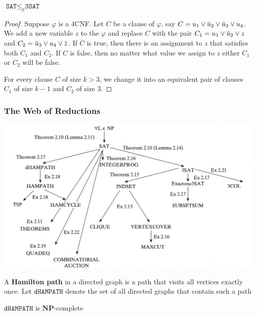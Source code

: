 \documentclass[11pt]{article}
\def \NP {\textbf{NP}}
\def \NP {\textbf{NP}}
\def \SAT {\texttt{SAT}}
\def \TSAT {\texttt{3SAT}}
\def \dHAMPATH {\texttt{dHAMPATH}}
\begin{document}
\begin{lemma}[]
\(\SAT\le_p\TSAT\)
\end{lemma}

\begin{proof}
Suppose \(\varphi\) is a 4CNF. Let \(C\) be a clause of \(\varphi\), say \(C=u_1\vee\baru_2\vee\baru_3\vee u_4\).
We add a new variable \(z\) to the \(\varphi\) and replace \(C\) with the pair
\(C_1=u_1\vee\baru_2\vee z\) and \(C_2=\baru_3\vee u_4\vee\barz\). If \(C\) is true, then there
is an assignment to \(z\) that satisfies both \(C_1\) and \(C_2\). If \(C\) is false, then no
matter what value we assign to \(z\) either \(C_1\) or \(C_2\) will be false.

For every clause \(C\) of size \(k>3\), we change it into an equivalent pair of clauses \(C_1\)
of size \(k-1\) and \(C_2\) of size 3.
\end{proof}


\subsubsection{The Web of Reductions}
\label{sec:org570a3fa}
\begin{center}
\includegraphics[width=.8\textwidth]{./3.png}
\end{center}

A \textbf{Hamilton path} in a directed graph is a path that visits all vertices exactly once. Let
\(\dHAMPATH\) denote the set of all directed graphs that contain such a path
\begin{theorem}[]
\(\dHAMPATH\) is \(\NP\)-complete
\end{theorem}
\end{document}
